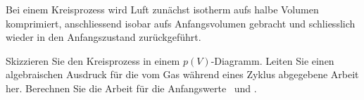 Bei einem Kreisprozess wird Luft zunächst isotherm aufs halbe Volumen komprimiert, anschliessend isobar aufs Anfangsvolumen gebracht und schliesslich wieder in den Anfangszustand zurückgeführt.
\begin{abcliste}
\abc Skizzieren Sie den Kreisprozess in einem $p(V)$-Diagramm.
\abc Leiten Sie einen algebraischen Ausdruck für die vom Gas während eines Zyklus abgegebene Arbeit her.
\abc Berechnen Sie die Arbeit für die Anfangswerte \VaO\ und \paO.
\end{abcliste}
